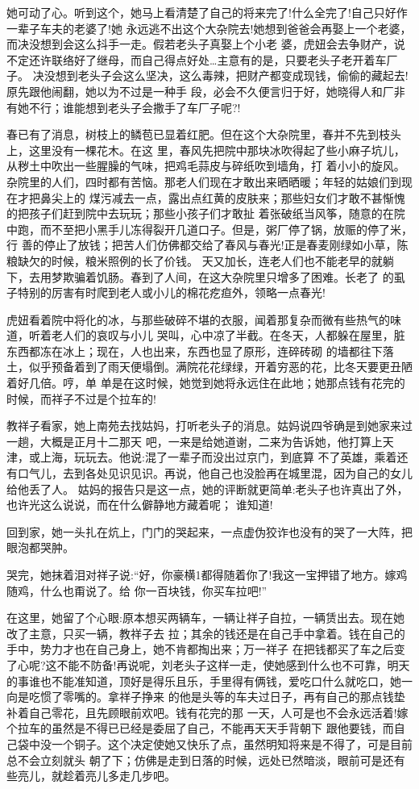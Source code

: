 \documentclass[11pt,a4paper,onecolumn]{article}
\begin{document}
她可动了心。听到这个，她马上看清楚了自己的将来\myrule 完了!什么全完了!自己只好作一辈子车夫的老婆了!她
永远逃不出这个大杂院去!她想到爸爸会再娶上一个老婆，而决没想到会这么抖手一走。假若老头子真娶上个小老
婆，虎妞会去争财产，说不定还许联络好了继母，而自己得点好处\ldots 主意有的是，只要老头子老开着车厂子。
决没想到老头子会这么坚决，这么毒辣，把财产都变成现钱，偷偷的藏起去!原先跟他闹翻，她以为不过是一种手
段，必会不久便言归于好，她晓得人和厂非有她不行；谁能想到老头子会撒手了车厂子呢?!

春已有了消息，树枝上的鳞苞已显着红肥。但在这个大杂院里，春并不先到枝头上，这里没有一棵花木。在这
里，春风先把院中那块冰吹得起了些小麻子坑儿，从秽土中吹出一些腥臊的气味，把鸡毛蒜皮与碎纸吹到墙角，打
着小小的旋风。杂院里的人们，四时都有苦恼。那老人们现在才敢出来晒晒暖；年轻的姑娘们到现在才把鼻尖上的
煤污减去一点，露出点红黄的皮肤来；那些妇女们才敢不甚惭愧的把孩子们赶到院中去玩玩；那些小孩子们才敢扯
着张破纸当风筝，随意的在院中跑，而不至把小黑手儿冻得裂开几道口子。但是，粥厂停了锅，放赈的停了米，行
善的停止了放钱；把苦人们仿佛都交给了春风与春光!正是春麦刚绿如小草，陈粮缺欠的时候，粮米照例的长了价钱。
天又加长，连老人们也不能老早的就躺下，去用梦欺骗着饥肠。春到了人间，在这大杂院里只增多了困难。长老了
的虱子\myrule 特别的厉害\myrule 有时爬到老人或小儿的棉花疙疸外，领略一点春光!

虎妞看着院中将化的冰，与那些破碎不堪的衣服，闻着那复杂而微有些热气的味道，听着老人们的哀叹与小儿
哭叫，心中凉了半截。在冬天，人都躲在屋里，脏东西都冻在冰上；现在，人也出来，东西也显了原形，连碎砖砌
的墙都往下落土，似乎预备着到了雨天便塌倒。满院花花绿绿，开着穷恶的花，比冬天要更丑陋着好几倍。哼，单
单是在这时候，她觉到她将永远住在此地；她那点钱有花完的时候，而祥子不过是个拉车的!

教祥子看家，她上南苑去找姑妈，打听老头子的消息。姑妈说四爷确是到她家来过一趟，大概是正月十二那天
吧，一来是给她道谢，二来为告诉她，他打算上天津，或上海，玩玩去。他说:混了一辈子而没出过京门，到底算
不了英雄，乘着还有口气儿，去到各处见识见识。再说，他自己也没脸再在城里混，因为自己的女儿给他丢了人。
姑妈的报告只是这一点，她的评断就更简单:老头子也许真出了外，也许光这么说说，而在什么僻静地方藏着呢；
谁知道!

回到家，她一头扎在炕上，门门的哭起来，一点虚伪狡诈也没有的哭了一大阵，把眼泡都哭肿。

哭完，她抹着泪对祥子说:``好，你豪横1都得随着你了!我这一宝押错了地方。嫁鸡随鸡，什么也甭说了。给
你一百块钱，你买车拉吧!''

在这里，她留了个心眼:原本想买两辆车，一辆让祥子自拉，一辆赁出去。现在她改了主意，只买一辆，教祥子去
拉；其余的钱还是在自己手中拿着。钱在自己的手中，势力才也在自己身上，她不肯都掏出来；万一祥子\myrule
在把钱都买了车之后\myrule 变了心呢?这不能不防备!再说呢，刘老头子这样一走，使她感到什么也不可靠，明天
的事谁也不能准知道，顶好是得乐且乐，手里得有俩钱，爱吃口什么就吃口，她一向是吃惯了零嘴的。拿祥子挣来
的\myrule 他是头等的车夫\myrule 过日子，再有自己的那点钱垫补着自己零花，且先顾眼前欢吧。钱有花完的那
一天，人可是也不会永远活着!嫁个拉车的\myrule 虽然是不得已\myrule 已经是委屈了自己，不能再天天手背朝下
跟他要钱，而自己袋中没一个铜子。这个决定使她又快乐了点，虽然明知将来是不得了，可是目前总不会立刻就头
朝了下；仿佛是走到日落的时候，远处已然暗淡，眼前可是还有些亮儿，就趁着亮儿多走几步吧。
\end{document}
